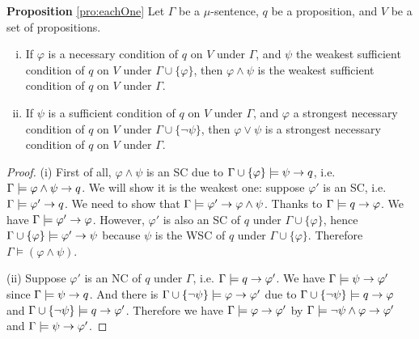 \documentclass[runningheads]{llncs}
\begin{document}
\noindent\textbf{Proposition} \ref{pro:eachOne}
Let $\Gamma$ be a $\mu$-sentence, $q$ be a proposition, and $V$ be a set of propositions.
\begin{enumerate}[(i)]
 \item If $\varphi$ is a necessary condition of $q$ on $V$ under $\Gamma$, and $\psi$ the weakest sufficient condition of $q$ on $V$ under $\Gamma \cup \{\varphi\}$, then $\varphi \wedge \psi$ is the weakest sufficient condition of $q$ on $V$ under $\Gamma$.\\
 \item  If $\psi$ is a sufficient condition of $q$ on $V$ under $\Gamma$, and $\varphi$ a strongest necessary condition of $q$ on $V$ under $\Gamma \cup \{\neg \psi\}$, then $\varphi \vee \psi$ is a strongest necessary condition of $q$ on $V$ under $\Gamma$.
 \end{enumerate}
\begin{proof}
(i) First of all, $\varphi \wedge \psi$ is an SC due to $\Gamma \cup \{\varphi\} \models \psi \rightarrow q$, i.e. $\Gamma \models \varphi \wedge \psi\rightarrow q$.
We will show it is the weakest one: suppose $\varphi'$ is an SC, i.e. $\Gamma \models \varphi' \rightarrow q$. We need to show that $\Gamma \models \varphi' \rightarrow \varphi \wedge \psi$. Thanks to $\Gamma \models q \rightarrow \varphi$. We have $\Gamma \models  \varphi' \rightarrow \varphi$. However, $\varphi'$ is also an SC of $q$ under $\Gamma \cup \{\varphi\}$, hence $\Gamma \cup \{\varphi\} \models  \varphi' \rightarrow \psi$ because $\psi$ is the WSC of $q$ under $\Gamma \cup \{\varphi\}$. Therefore $\Gamma \models (\varphi \wedge \psi)$.

(ii) Suppose $\varphi'$ is an NC of $q$ under $\Gamma$, i.e. $\Gamma \models q \rightarrow \varphi'$. We have $\Gamma \models \psi \rightarrow \varphi'$ since $\Gamma \models \psi \rightarrow q$. And there is $\Gamma \cup \{\neg \psi\} \models \varphi \rightarrow \varphi'$ due to $\Gamma \cup \{\neg \psi\} \models q \rightarrow \varphi$ and $\Gamma \cup \{\neg \psi\} \models q \rightarrow \varphi'$. Therefore we have $\Gamma \models \varphi \rightarrow \varphi'$ by $\Gamma \models \neg \psi \wedge \varphi \rightarrow \varphi'$ and $\Gamma \models \psi \rightarrow \varphi'$.
\end{proof}
\end{document}
